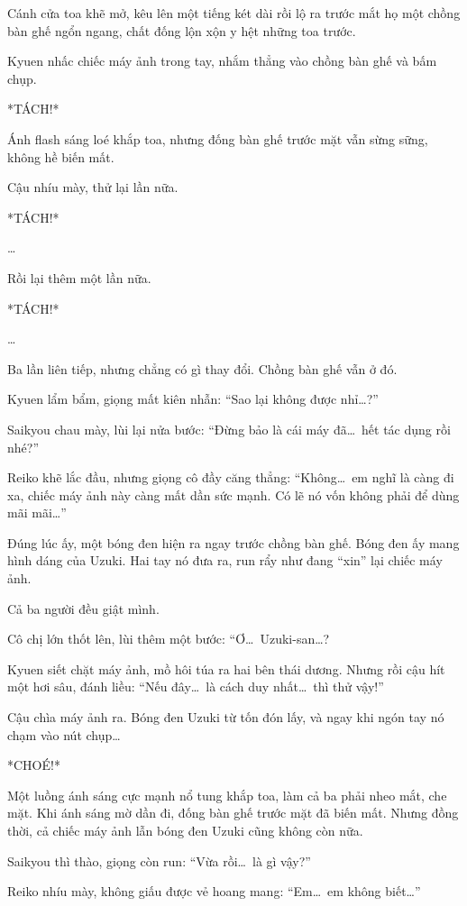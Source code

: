 \documentclass[../main.tex]{subfiles}
\begin{document}
Cánh cửa toa khẽ mở, kêu lên một tiếng két dài rồi lộ ra trước mắt họ một chồng bàn ghế ngổn ngang, chất đống lộn xộn y hệt những toa trước.

Kyuen nhấc chiếc máy ảnh trong tay, nhắm thẳng vào chồng bàn ghế và bấm chụp.

*TÁCH!*

Ánh flash sáng loé khắp toa, nhưng đống bàn ghế trước mặt vẫn sừng sững, không hề biến mất.

Cậu nhíu mày, thử lại lần nữa.

*TÁCH!*

\dots

Rồi lại thêm một lần nữa.

*TÁCH!*

\dots

Ba lần liên tiếp, nhưng chẳng có gì thay đổi. Chồng bàn ghế vẫn ở đó.

Kyuen lẩm bẩm, giọng mất kiên nhẫn: ``Sao lại không được nhỉ\dots?''

Saikyou chau mày, lùi lại nửa bước: ``Đừng bảo là cái máy đã\dots\ hết tác dụng rồi nhé?''

Reiko khẽ lắc đầu, nhưng giọng cô đầy căng thẳng: ``Không\dots\ em nghĩ là càng đi xa, chiếc máy ảnh này càng mất dần sức mạnh. Có lẽ nó vốn không phải để dùng mãi mãi\dots''

Đúng lúc ấy, một bóng đen hiện ra ngay trước chồng bàn ghế. Bóng đen ấy mang hình dáng của Uzuki. Hai tay nó đưa ra, run rẩy như đang ``xin'' lại chiếc máy ảnh.

Cả ba người đều giật mình.

Cô chị lớn thốt lên, lùi thêm một bước: ``Ơ\dots\ Uzuki-san\dots?

Kyuen siết chặt máy ảnh, mồ hôi túa ra hai bên thái dương. Nhưng rồi cậu hít một hơi sâu, đánh liều: ``Nếu đây\dots\ là cách duy nhất\dots\ thì thử vậy!''

Cậu chìa máy ảnh ra. Bóng đen Uzuki từ tốn đón lấy, và ngay khi ngón tay nó chạm vào nút chụp\dots

*CHOÉ!*

Một luồng ánh sáng cực mạnh nổ tung khắp toa, làm cả ba phải nheo mắt, che mặt. Khi ánh sáng mờ dần đi, đống bàn ghế trước mặt đã biến mất. Nhưng đồng thời, cả chiếc máy ảnh lẫn bóng đen Uzuki cũng không còn nữa.

Saikyou thì thào, giọng còn run: ``Vừa rồi\dots\ là gì vậy?''

Reiko nhíu mày, không giấu được vẻ hoang mang: ``Em\dots\ em không biết\dots''
\end{document}
